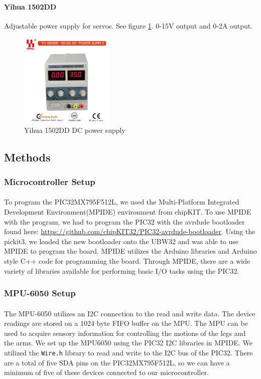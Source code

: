 \documentclass[titlepage,letterpaper,12pt]{article}
\begin{document}
\paragraph{Yihua 1502DD}Adjustable power supply for servos. See figure
\ref{yihuafig}. 0-15V output and 0-2A output\cite{yihuadata}. 

\begin{figure}
  \centering
    \includegraphics[width=0.4\textwidth]{figures/Power_Supply_YIHUA_1502DD.jpg}
  \caption{Yihua 1502DD DC power supply\protect\cite{yihuafigcite}}
  \label{yihuafig}
\end{figure}

\subsection{Methods}
\subsubsection{Microcontroller Setup}
\paragraph{}To program the PIC32MX795F512L, we used the Multi-Platform
Integrated Development Environment(MPIDE) environment from chipKIT. To use MPIDE
with the program, we had to program the PIC32 with the avrdude bootloader found
here: \url{https://github.com/chipKIT32/PIC32-avrdude-bootloader}. Using the
pickit3, we loaded the new bootloader onto the UBW32 and was able to use MPIDE
to program the board. MPIDE utilizes the Arduino libraries and Arduino style C++
code for programming the board. Through MPIDE, there are a wide variety of
libraries available for performing basic I/O tasks using the PIC32.

\subsubsection{MPU-6050 Setup}
\paragraph{}The MPU-6050 utilizes an I2C connection to the read and write data.
The device readings are stored on a 1024 byte FIFO buffer on the
MPU\cite{mpu6050data}. The MPU can be used to acquire sensory information for
controlling the motions of the legs and the arms. We set up the MPU6050 using
the PIC32 I2C libraries in MPIDE. We utilized the \verb!Wire.h! library to read
and write to the I2C bus of the PIC32\cite{Krodal2013}. There are a total of
five SDA pins on the PIC32MX795F512L, so we can have a minimum of five of these
devices connected to our microcontroller.
\end{document}
